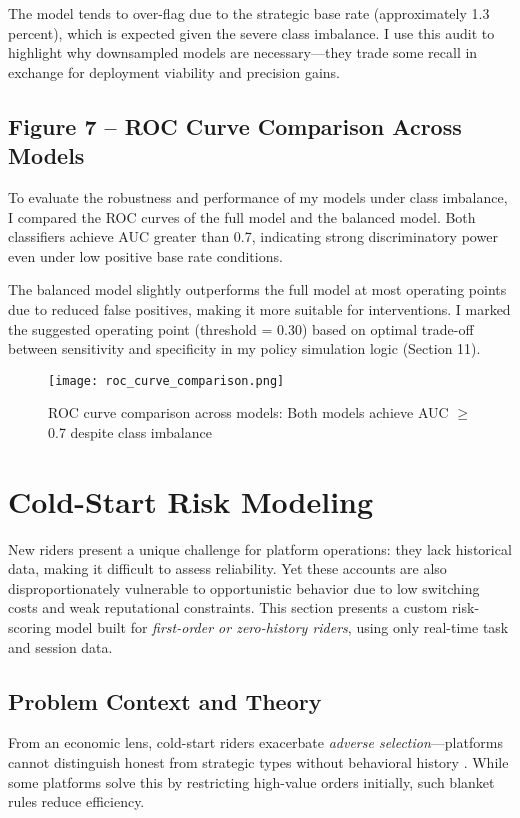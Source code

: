 \documentclass[12pt,letterpaper]{article}
\begin{document}
The model tends to over-flag due to the strategic base rate (approximately 1.3 percent), which is expected given the severe class imbalance. I use this audit to highlight why downsampled models are necessary—they trade some recall in exchange for deployment viability and precision gains.

\subsection*{Figure 7 -- ROC Curve Comparison Across Models}

To evaluate the robustness and performance of my models under class imbalance, I compared the ROC curves of the full model and the balanced model. Both classifiers achieve AUC greater than 0.7, indicating strong discriminatory power even under low positive base rate conditions.

The balanced model slightly outperforms the full model at most operating points due to reduced false positives, making it more suitable for interventions. I marked the suggested operating point (threshold = 0.30) based on optimal trade-off between sensitivity and specificity in my policy simulation logic (Section 11).

\begin{figure}[H]
\centering
\texttt{[image: roc\_curve\_comparison.png]}
\caption{ROC curve comparison across models: Both models achieve AUC $\geq$ 0.7 despite class imbalance}
\label{fig:roc_comparison}
\end{figure}

\section{Cold-Start Risk Modeling}

New riders present a unique challenge for platform operations: they lack historical data, making it difficult to assess reliability. Yet these accounts are also disproportionately vulnerable to opportunistic behavior due to low switching costs and weak reputational constraints. This section presents a custom risk-scoring model built for \textit{first-order or zero-history riders}, using only real-time task and session data.

\subsection{Problem Context and Theory}

From an economic lens, cold-start riders exacerbate \textit{adverse selection}—platforms cannot distinguish honest from strategic types without behavioral history \citep{akerlof1970lemons}. While some platforms solve this by restricting high-value orders initially, such blanket rules reduce efficiency.
\end{document}
